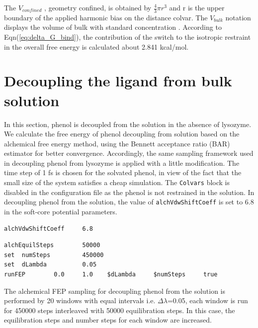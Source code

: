 \documentclass[9pt,tutorial]{livecoms}
\begin{document}
The {$V_{confined}$} , geometry confined, is obtained by {$\frac{4}{3}\pi r^{3}$} and r is the upper boundary of the applied harmonic bias on the distance colvar. The {$V_{bulk}$} notation displays the volume of bulk with standard concentration \cite{Salari2018}. According to Eqn(\ref{eq:delta_G_bind}), the contribution of the switch to the isotropic restraint in the overall free energy is calculated about 2.841 kcal/mol.

\section{Decoupling the ligand from bulk solution}\label{sec:11}

In this section, phenol is decoupled from the solution in the absence of lysozyme. We calculate the free energy of phenol decoupling from solution based on the alchemical free energy method, using the Bennett acceptance ratio (BAR) estimator for better convergence. Accordingly, the same sampling framework used in decoupling phenol from lysozyme is applied with a little modification. The time step of 1 fs is chosen for the solvated phenol, in view of the fact that the small size of the system satisfies a cheap simulation. The \texttt{Colvars} block is disabled in the configuration file as the phenol is not restrained in the solution. In decoupling phenol from the solution, the value of \texttt{alchVdwShiftCoeff} is set to 6.8 in the soft-core potential parameters. 

\begin{verbatim}
alchVdwShiftCoeff     6.8
\end{verbatim}

\begin{verbatim}
alchEquilSteps        50000
set  numSteps         450000
set  dLambda          0.05
runFEP        0.0     1.0    $dLambda     $numSteps     true
\end{verbatim}
The alchemical FEP sampling for decoupling phenol from the solution is performed by 20 windows with equal intervals i.e. {$\Delta\lambda$=0.05}, each window is run for 450000 steps interleaved with 50000 equilibration steps. In this case, the equilibration steps and number steps for each window are increased.
\end{document}
